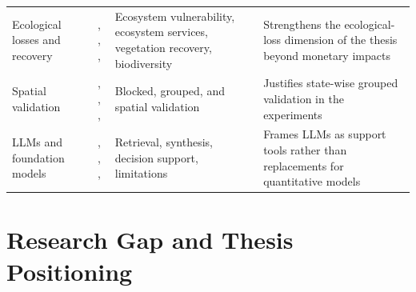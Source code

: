 \begin{table}[htbp]
{\begin{tabular}{p{3.2cm}p{4.2cm}p{4.2cm}p{5.5cm}}
Ecological losses and recovery & \citet{arrogantefunes2024ecological}, \citet{rocesdiaz2022ecosystemservices}, \citet{perezcabello2021postfire}, \citet{laterza2026multifunctionality} & Ecosystem vulnerability, ecosystem services, vegetation recovery, biodiversity & Strengthens the ecological-loss dimension of the thesis beyond monetary impacts \\
Spatial validation & \citet{roberts2017crossvalidation}, \citet{valavi2019blockcv}, \citet{meyer2021aoa}, \citet{wang2023spatialplus} & Blocked, grouped, and spatial validation & Justifies state-wise grouped validation in the experiments \\
LLMs and foundation models & \citet{xie2024wildfiregpt}, \citet{lin2024llmresearch}, \citet{cheng2026retrieval}, \citet{ramesh2025assessingwildfiregpt} & Retrieval, synthesis, decision support, limitations & Frames LLMs as support tools rather than replacements for quantitative models \\
\hline
\end{tabular}%
}
\end{table}

\section{Research Gap and Thesis Positioning}

